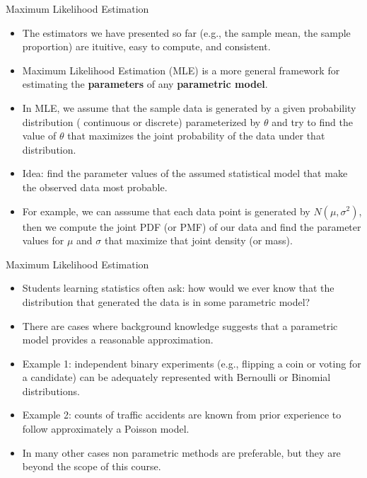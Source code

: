 \documentclass[handout]{beamer}
\begin{document}
\begin{frame}{Maximum Likelihood Estimation}
\scriptsize{
\begin{itemize}
 \item The estimators we have presented so far (e.g., the sample mean, the sample proportion) are ituitive, easy to compute, and consistent.
 \item Maximum Likelihood Estimation (MLE) is a more general framework  for estimating the \textbf{parameters} of any \textbf{parametric model}.
 \item In MLE, we assume that the sample data is generated by a given probability distribution ( continuous or discrete) parameterized by $\theta$ and try to find the value of $\theta$ that maximizes the joint probability of the data under that distribution. 
 \item Idea: find the parameter values of the assumed statistical model that make the observed data most probable.
 \item For example, we can asssume that each data point is generated by $N(\mu,\sigma^2)$, then we compute the joint PDF (or PMF) of our data and find the parameter values for $\mu$ and $\sigma$ that maximize that joint density (or mass).
 
\end{itemize}


} 
 
\end{frame}

\begin{frame}{Maximum Likelihood Estimation}
\scriptsize{
\begin{itemize}
 \item Students learning statistics often ask: how would we ever know that the distribution that generated the data is in some parametric model? \cite{wasserman2013all}
 \item There are  cases where background knowledge suggests that a parametric model provides a reasonable approximation. 
 \item Example 1: independent binary experiments (e.g., flipping a coin or voting for a candidate) can be adequately represented with Bernoulli or Binomial distributions.
 \item Example 2: counts of traffic accidents are known from prior experience to follow approximately a Poisson model.  
 
 \item  In many other cases non parametric methods are preferable, but they are beyond the scope of this course.
 
\end{itemize}


} 
 
\end{frame}
\end{document}
